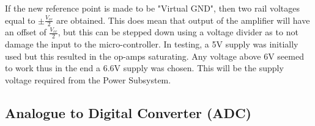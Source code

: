 \documentclass[class=report,11pt,crop=false]{standalone}
\begin{document}
	If the new reference point is made to be "Virtual GND", then two rail voltages equal to $\pm \frac{V_{cc}}{2}$ are obtained. This does mean that output of the amplifier will have an offset of $\frac{V_{cc}}{2}$, but this can be stepped down using a voltage divider as to not damage the input to the micro-controller. In testing, a 5V supply was initially used but this resulted in the op-amps saturating. Any voltage above 6V seemed to work thus in the end a 6.6V supply was chosen. This will be the supply voltage required from the Power Subsystem.
	
	\subsection{Analogue to Digital Converter (ADC)}
	
	\ifstandalone
	
	\printnoidxglossary[type=\acronymtype,nonumberlist]
	\fi
\end{document}
